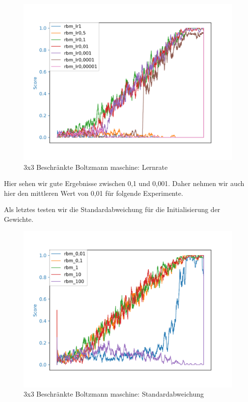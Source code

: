 \begin{figure}[H]
\centering
\includegraphics[width=\textwidth]{Figures/rbm5_3x3_rbm_lr1_rbm_lr0,5_rbm_lr0,1_rbm_lr0,01_rbm_lr0,001_rbm_lr0,0001_rbm_lr0,00001.png}
\caption{3x3 Beschränkte Boltzmann maschine: Lernrate}
\label{rbm4}
\end{figure}

Hier sehen wir gute Ergebnisse zwischen 0,1 und 0,001. Daher nehmen wir auch hier den mittleren Wert von 0,01 für folgende Experimente.

Als letztes testen wir die Standardabweichung für die Initialisierung der Gewichte.

\begin{figure}[H]
\centering
\includegraphics[width=\textwidth]{Figures/rbm7_3x3_rbm_0,01_rbm_0,1_rbm_1_rbm_10_rbm_100.png}
\caption{3x3 Beschränkte Boltzmann maschine: Standardabweichung}
\label{rbm5}
\end{figure}


